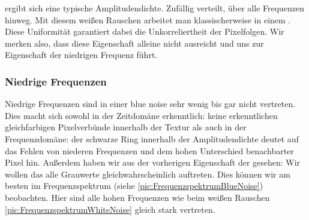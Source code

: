 ergibt sich eine typische Amplitudendichte. Zufällig verteilt, über alle 
Frequenzen hinweg. Mit diesem weißen Rauschen arbeitet man klassischerweise in einem .
Diese Uniformität garantiert dabei die Unkorreliertheit der Pixelfolgen. Wir merken also, dass 
diese Eigenschaft alleine nicht ausreicht und uns zur Eigenschaft der niedrigen Frequenz führt.

\subsubsection{Niedrige Frequenzen}
\label{ch:Content1:sec:blue noise:Niedrige Frequenzen}
Niedrige Frequenzen sind in einer blue noise sehr wenig bis gar nicht 
vertreten. Dies macht sich sowohl in der Zeitdomäne erkenntlich: keine erkenntlichen gleichfarbigen Pixelverbünde 
innerhalb der Textur als auch in der Frequenzdomäne: der schwarze Ring innerhalb der Amplitudendichte
deutet auf das Fehlen von niederen Frequenzen und dem hohen Unterschied benachbarter Pixel hin.
Außerdem haben wir aus der vorherigen Eigenschaft der  gesehen:
Wir wollen das alle Grauwerte gleichwahrscheinlich auftreten. Dies können wir am besten im Frequenzspektrum 
(siehe \ref{pic:FrequenzspektrumBlueNoise})
beobachten. Hier sind alle hohen Frequenzen wie beim weißen Rauschen \ref{pic:FrequenzspektrumWhiteNoise} gleich stark vertreten.

